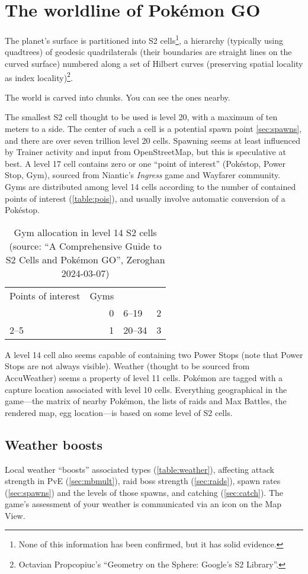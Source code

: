 \section{The worldline of Pokémon GO\label{sec:world}}
The planet's surface is partitioned into S2 cells\footnote{None of this information has been confirmed, but it has solid evidence.}, a hierarchy (typically using
 quadtrees) of geodesic quadrilaterals (their boundaries are straight lines on the curved
 surface) numbered along a set of Hilbert curves (preserving spatial locality as index locality)\footnote{Octavian Propcopiuc's ``Geometry on the Sphere: Google's S2 Library''.}.
\begin{tipbox}[title=If that meant nothing to you…]
The world is carved into chunks. You can see the ones nearby.
\end{tipbox}
The smallest S2 cell thought to be used is level 20, with a maximum of ten meters to a side.
The center of such a cell is a potential spawn point \autoref{sec:spawns}, and there are over seven trillion level 20 cells.
Spawning seems at least influenced by Trainer activity and input from OpenStreetMap, but this is speculative at best.
A level 17 cell contains zero or one ``point of interest'' (Pokéstop, Power Stop, Gym),
 sourced from Niantic's \textit{Ingress} game and Wayfarer community.
Gyms are distributed among level 14 cells according to the number of contained points of interest (\autoref{table:pois}),
 and usually involve automatic conversion of a Pokéstop.
\begin{table}
\centering
\begin{tabular}{lr|lr}
Points of interest & Gyms\\
\Midrule
1 & 0 & 6--19 & 2\\
2--5 & 1 & 20--34 & 3\\
\end{tabular}
\caption[Gym allocation in level 14 S2 cells]{Gym allocation in level 14 S2 cells (source: ``A Comprehensive Guide to S2 Cells and Pokémon GO'', Zeroghan 2024-03-07)\label{table:pois}}
\end{table}
A level 14 cell also seems capable of containing two Power Stops (note that Power Stops are not always visible).
 Weather (thought to be sourced from AccuWeather) seems a property of level 11 cells.
Pokémon are tagged with a capture location associated with level 10 cells.
Everything geographical in the game---the matrix of nearby Pokémon, the lists
 of raids and Max Battles, the rendered map, egg location---is based on some level of S2 cells.
\subsection{Weather boosts\label{sec:weather}}
Local weather ``boosts'' associated types (\autoref{table:weather}),
  affecting attack strength in PvE (\autoref{sec:mbmult}),
  raid boss strength (\autoref{sec:raids}),
  spawn rates (\autoref{sec:spawns}) and the levels of those spawns,
  and catching (\autoref{sec:catch}).
The game's assessment of your weather is communicated via an icon on the Map View.
\begin{table}

\end{table}
